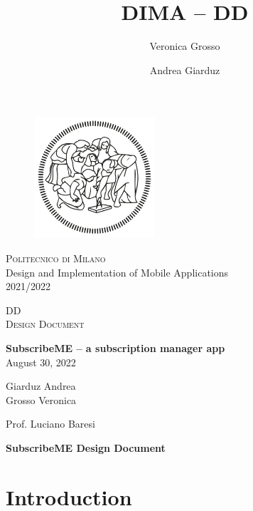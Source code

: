 \documentclass[11pt]{article}
\title{DIMA -- DD}
\author{Veronica Grosso \and Andrea Giarduz}
\begin{document}
\begin{titlepage}
    \begin{center}
        \vspace*{1cm}
        \begin{figure}[h]
            \begin{center}
                \includegraphics[width=4.5cm, clip]{../../assets/logo.png}
            \end{center}
            \label{title:logo}
        \end{figure}
        \vspace*{1cm}
        \LARGE{{\scshape Politecnico di Milano}}
        \\
        \LARGE{Design and Implementation of Mobile Applications}
        \\
        \LARGE{2021/2022}

        \vspace*{1.5cm}
        \Huge{DD}
        \\
        \Large{{\scshape Design Document}}

        \vspace{1.5cm}

        \LARGE{\textbf{SubscribeME -- a subscription manager app}}
        \\
        \vspace{1cm}
        \Large{August 30, 2022}
        \vfill

        \Large{Giarduz Andrea\\
            Grosso Veronica
        }

        \vspace{0.8cm}

        \Large
        Prof. Luciano Baresi
    \end{center}
\end{titlepage}
\tableofcontents

\newpage
\begin{center}
    \LARGE{\textbf{SubscribeME Design Document}}
\end{center}
\section{Introduction}\label{sec:intro}
\end{document}

